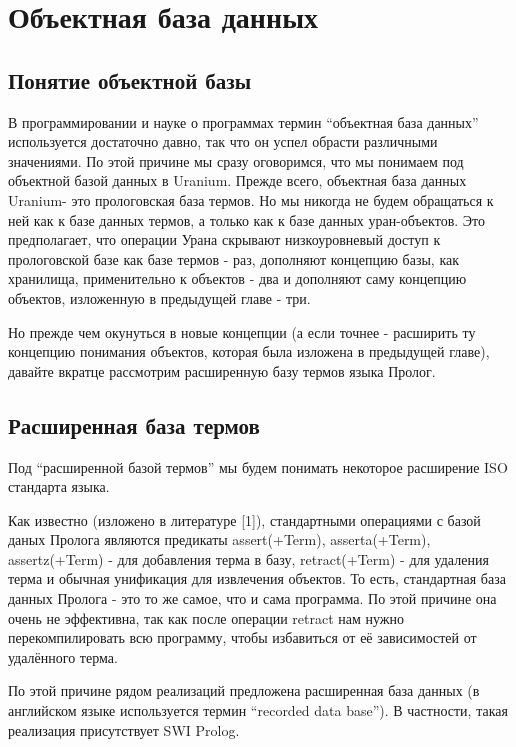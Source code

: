 \documentclass[a4paper]{book}
\def\ur{Uranium}
\begin{document}

\chapter{Объектная база данных}
\label{ur_recorded_db}

\section{Понятие объектной базы}

В программировании и науке о программах термин ``объектная база
данных'' используется достаточно давно, так что он успел обрасти
различными значениями. По этой причине мы сразу оговоримся, что
мы понимаем под объектной базой данных в \ur. Прежде всего,
объектная база данных \ur - это прологовская база термов. Но
мы никогда не будем обращаться к ней как к базе данных термов, а
только как к базе данных уран-объектов. Это предполагает, что
операции Урана скрывают низкоуровневый доступ к прологовской базе
как базе термов - раз, дополняют концепцию базы, как хранилища,
применительно к объектов - два и дополняют саму концепцию
объектов, изложенную в предыдущей главе - три.

Но прежде чем окунуться в новые концепции (а если точнее -
расширить ту концепцию понимания объектов, которая была изложена
в предыдущей главе), давайте вкратце рассмотрим расширенную базу
термов языка Пролог.
 
\section{Расширенная база термов}

Под ``расширенной базой термов'' мы будем понимать некоторое
расширение ISO стандарта языка. 

Как известно (изложено в литературе [1]), стандартными операциями
с базой даных Пролога являются предикаты  assert(+Term),
asserta(+Term), assertz(+Term) - для добавления терма в базу,
retract(+Term) - для удаления терма и обычная унификация для
извлечения объектов. То есть, стандартная база данных Пролога -
это то же самое, что и сама программа. По этой причине она очень
не эффективна, так как после операции retract нам нужно
перекомпилировать всю программу, чтобы избавиться от её
зависимостей от удалённого терма.

По этой причине рядом реализаций предложена расширенная база
данных (в английском языке используется термин ``recorded data
base''). В частности, такая реализация присутствует SWI Prolog.
\end{document}
